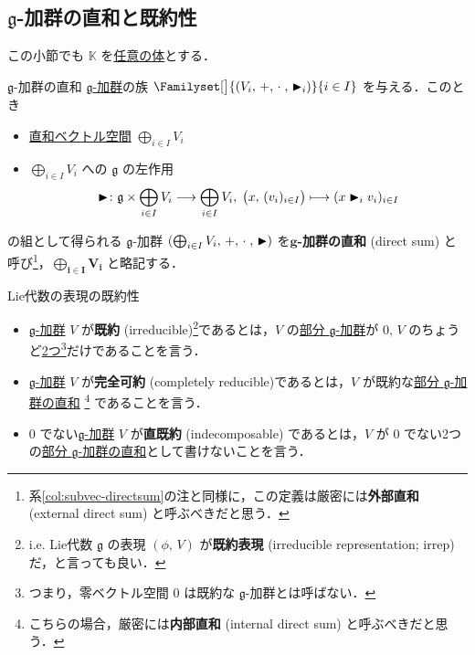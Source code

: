 \documentclass[rep_main]{subfiles}
\begin{document}
\subsection{$\mathfrak{g}$-加群の直和と既約性}

この小節でも $\mathbb{K}$ を\underline{任意の体}とする．

\begin{mydef}[label=def:gmod-directsum,breakable]{$\mathfrak{g}$-加群の直和}
	\hyperref[ax:g-module]{ $\mathfrak{g}$-加群}の族 $\Familyset[\big]{(V_i,\, +,\, \cdot\;,\, \btr_i)}{i \in I}$ を与える．このとき
	\begin{itemize}
		\item \hyperref[def:univ-vec-sum]{直和ベクトル空間} $\bigoplus_{i \in I} V_i$
		\item $\bigoplus_{i \in I} V_i$ への $\mathfrak{g}$ の左作用
		\begin{align}
			\blacktriangleright \colon \mathfrak{g} \times \bigoplus_{i \in I} V_i \longrightarrow \bigoplus_{i \in I} V_i,\; \bigl(x,\, (v_i)_{i \in I}\bigr) \longmapsto (x \blacktriangleright_i v_i)_{i \in I}
		\end{align}
	\end{itemize}
	の組として得られる $\mathfrak{g}$-加群 $(\bigoplus_{i \in I} V_i,\, +,\, \cdot\;,\, \blacktriangleright)$ を\textbf{$\mathfrak{\bm{g}}$-加群の直和} (direct sum) と呼び\footnote{系\ref{col:subvec-directsum}の注と同様に，この定義は厳密には\textbf{外部直和} (external direct sum) と呼ぶべきだと思う．}，$\bm{\bigoplus_{i \in I} V_i}$ と略記する．
\end{mydef}

\begin{mydef}[label=def:irr]{Lie代数の表現の既約性}
    \begin{itemize}
		\item \hyperref[ax:g-module]{ $\mathfrak{g}$-加群} $V$ が\textbf{既約} (irreducible)\footnote{i.e. Lie代数 $\mathfrak{g}$ の表現 $(\phi,\, V)$ が\textbf{既約表現} (irreducible representation; irrep) だ，と言っても良い．}であるとは，$V$ の\hyperref[def:sub-g-module]{部分 $\mathfrak{g}$-加群}が $0,\, V$ のちょうど\underline{2つ}\footnote{つまり，零ベクトル空間 $0$ は既約な $\mathfrak{g}$-加群とは呼ばない．}だけであることを言う．
		\item \hyperref[ax:g-module]{ $\mathfrak{g}$-加群} $V$ が\textbf{完全可約} (completely reducible)であるとは，$V$ が既約な\hyperref[def:gmod-directsum]{部分 $\mathfrak{g}$-加群の直和}
		\footnote{こちらの場合，厳密には\textbf{内部直和} (internal direct sum) と呼ぶべきだと思う．}
		であることを言う．
		\item $0$ でない\hyperref[ax:g-module]{$\mathfrak{g}$-加群} $V$ が\textbf{直既約} (indecomposable) であるとは，$V$ が $0$ でない2つの\hyperref[def:gmod-directsum]{部分 $\mathfrak{g}$-加群の直和}として書けないことを言う．
	\end{itemize}
\end{mydef}
\end{document}
